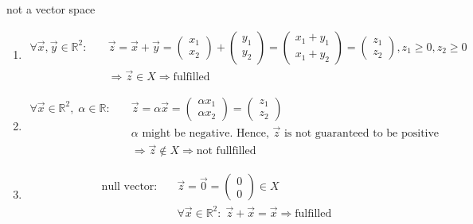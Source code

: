 \begin{solution}[print = false]
not a vector space
\begin{enumerate}
\item \begin{align*}
\forall \vec x,\vec y \in \mathbb{R}^2:\quad & \vec z = \vec x + \vec y = \begin{pmatrix}
x_1 \\ x_2
\end{pmatrix}
+ \begin{pmatrix}
y_1 \\ y_2
\end{pmatrix} = \begin{pmatrix}
x_1 + y_1 \\ x_1 + y_2
\end{pmatrix}
= 
\begin{pmatrix}
z_1 \\ z_2
\end{pmatrix}, z_1 \geq 0, z_2 \geq 0\\
& \Rightarrow \vec z \in X \Rightarrow \text{fulfilled}
\end{align*}
\item \begin{align*}
\forall \vec x \in \mathbb{R}^2,\; \alpha \in \mathbb{R}: \quad & \vec z = \alpha \vec x = \begin{pmatrix}
\alpha x_1 \\ \alpha x_2
\end{pmatrix}  = \begin{pmatrix}
z_1 \\ z_2
\end{pmatrix}\\
&\alpha\text{ might be negative. Hence, }\vec z\text{ is not guaranteed to be positive}\\
& \Rightarrow \vec z \notin X \Rightarrow \text{not fullfilled}
\end{align*}
\item 
\begin{align*}
\text{null vector:}\quad & \vec z = \vec 0 = \begin{pmatrix}
0 \\ 0
\end{pmatrix} \in X\\
& \forall \vec{x} \in \mathbb{R}^2:\; \vec{z} + \vec x = \vec x \Rightarrow \text{fulfilled}
\end{align*}
\end{enumerate}
\end{solution}


